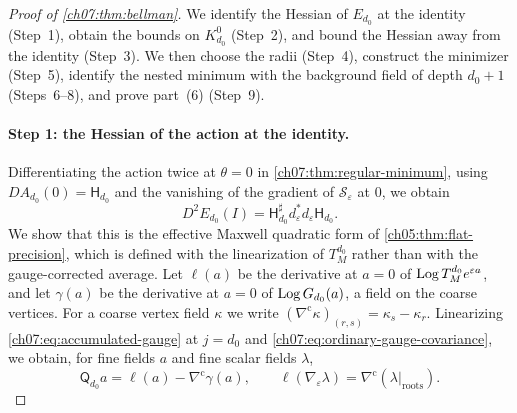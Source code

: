 \begin{proof}[Proof of \cref{ch07:thm:bellman}]
We identify the Hessian of $E_{d_0}$ at the identity (Step~1), obtain the bounds on $K_{d_0}^0$ (Step~2), and bound the Hessian away from the identity (Step~3). We then choose the radii (Step~4), construct the minimizer (Step~5), identify the nested minimum with the background field of depth $d_0+1$ (Steps~6--8), and prove part~(6) (Step~9).

\paragraph{Step 1: the Hessian of the action at the identity.}
Differentiating the action twice at $\theta=0$ in \cref{ch07:thm:regular-minimum}, using $DA_{d_0}(0)=\mathsf H_{d_0}$ and the vanishing of the gradient of $\mathscr S_\varepsilon$ at $0$, we obtain
\begin{equation}\label{ch07:eq:flat-value-hessian}
 D^2E_{d_0}(I)=\mathsf H_{d_0}^\sharp d_\varepsilon^*d_\varepsilon\mathsf H_{d_0}.
\end{equation}
We show that this is the effective Maxwell quadratic form of \cref{ch05:thm:flat-precision}, which is defined with the linearization of $T_M^{d_0}$ rather than with the gauge-corrected average. Let $\ell(a)$ be the derivative at $a=0$ of $\operatorname{Log} T_M^{d_0}e^{\varepsilon a}$, and let $\gamma(a)$ be the derivative at $a=0$ of $\operatorname{Log} G_{d_0}(a)$, a field on the coarse vertices. For a coarse vertex field $\kappa$ we write $(\nabla^{\mathrm c}\kappa)_{(r,s)}=\kappa_s-\kappa_r$. Linearizing \eqref{ch07:eq:accumulated-gauge} at $j=d_0$ and \eqref{ch07:eq:ordinary-gauge-covariance}, we obtain, for fine fields $a$ and fine scalar fields $\lambda$,
\[
 \mathsf Q_{d_0}a=\ell(a)-\nabla^{\mathrm c}\gamma(a),\qquad
 \ell(\nabla_\varepsilon\lambda)=\nabla^{\mathrm c}(\lambda|_{\mathrm{roots}}).
\]

\end{proof}
